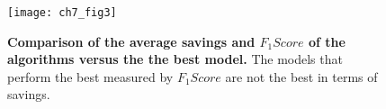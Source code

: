 \begin{figure}[!t]
  \centering
  \texttt{[image: ch7\_fig3]}
  \caption{\textbf{Comparison of the average savings and $F_1Score$ of the algorithms versus the 
    the best model.} The models that perform the best measured by $F_1Score$ are not the best 
  in terms of savings.}
  \label{fig:7:comparison_per_best}
\end{figure}

